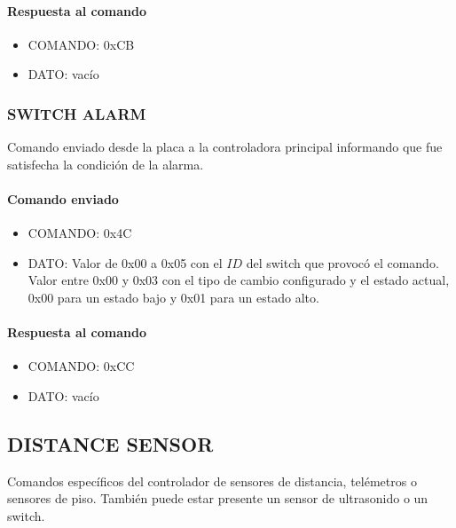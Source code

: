 \paragraph*{Respuesta al comando}

\begin{itemize}
	\item{COMANDO:} 0xCB
	\item{DATO:} vac\'io
\end{itemize}

\subsubsection{SWITCH ALARM}
\label{hA_protocolo_switch_alarm_servos}

Comando enviado desde la placa a la controladora principal informando que fue satisfecha la condici\'on de la alarma.

\paragraph*{Comando enviado}

\begin{itemize}
	\item{COMANDO:} 0x4C
	\item{DATO:} Valor de 0x00 a 0x05 con el $ID$ del switch que provoc\'o el comando.
	Valor entre 0x00 y 0x03 con el tipo de cambio configurado y el estado actual, 0x00 para un estado bajo y 
	0x01 para un estado alto.
\end{itemize}

\paragraph*{Respuesta al comando}

\begin{itemize}
	\item{COMANDO:} 0xCC
	\item{DATO:} vac\'io
\end{itemize}

\subsection{DISTANCE SENSOR}
\label{hA_protocolo_grupo_distance_sensor}

Comandos espec\'ificos del controlador de sensores de distancia, tel\'emetros o sensores de piso.
Tambi\'en puede estar presente un sensor de ultrasonido o un switch.

